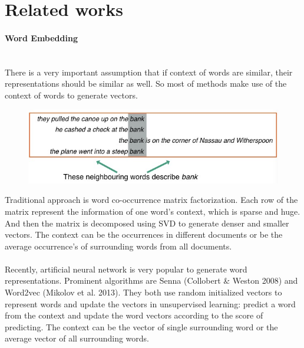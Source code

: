 \documentclass{scrartcl}
\begin{document}
\section{Related works}
\paragraph{Word Embedding}
\hfill \\
There is a very important assumption that if context of words are similar, their representations should be similar as well. So most of methods make use of the context of words to generate vectors.\\
\begin{figure}[H]
\centering
\begin{minipage}{1.0\textwidth}
 
	\includegraphics[width=1.0\textwidth]{neighbouring_words} 
	
	\label{fig:neighbouring_words}
\end{minipage}%
\end{figure}	
Traditional approach is word co-occurrence matrix factorization. Each row of the matrix represent the information of one word's context, which is sparse and huge. And then the matrix is decomposed using SVD to generate denser and smaller vectors. The context can be the occurrences in different documents or be the average occurrence's of surrounding words from all documents.  \\
\\         
Recently, artificial neural network is very popular to generate word representations. Prominent algorithms are Senna (Collobert \& Weston 2008) and Word2vec (Mikolov et al. 2013). They both use random initialized vectors to represent words and update the vectors in unsupervised learning: predict a word from the context and update the word vectors according to the score of predicting. The context can be the vector of single surrounding word or the average vector of all surrounding words.\\
\end{document}
